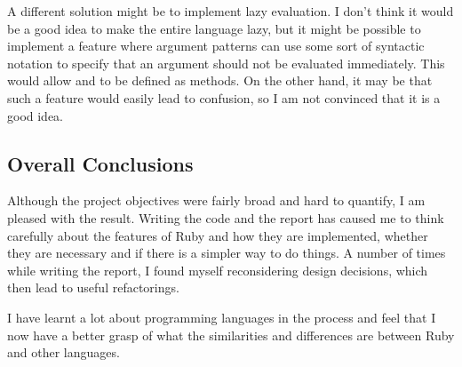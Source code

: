 A different solution might be to implement lazy evaluation. I don't think it would be a good idea to make the entire language lazy, but it might be possible to implement a feature where argument patterns can use some sort of syntactic notation to specify that an argument should not be evaluated immediately. This would allow \code{&&} and \code{||} to be defined as methods. On the other hand, it may be that such a feature would easily lead to confusion, so I am not convinced that it is a good idea.

\subsection{Overall Conclusions}

Although the project objectives were fairly broad and hard to quantify, I am pleased with the result. Writing the code and the report has caused me to think carefully about the features of Ruby and how they are implemented, whether they are necessary and if there is a simpler way to do things. A number of times while writing the report, I found myself reconsidering design decisions, which then lead to useful refactorings.

I have learnt a lot about programming languages in the process and feel that I now have a better grasp of what the similarities and differences are between Ruby and other languages.
